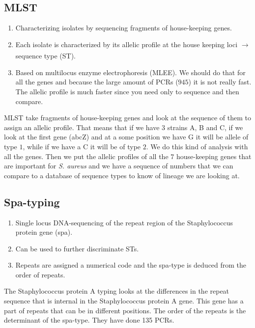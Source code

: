 \subsection{MLST}

\begin{enumerate}
    \item Characterizing isolates by sequencing fragments of house-keeping genes. 
    \item Each isolate is characterized by its allelic profile at the house keeping loci $\xrightarrow[]{}$ sequence type (ST). 
    \item Based on multilocus enzyme electrophoresis (MLEE). We should do that for all the genes and because the large amount of PCRs ($945$) it is not really fast. The allelic profile is much faster since you need only to sequence and then compare. 
\end{enumerate}

MLST take fragments of house-keeping genes and look at the sequence of them to assign an allelic profile. That means that if we have $3$ strains A, B and C, if we look at the first gene (abcZ) and at a some position we have G it will be allele of type $1$, while if we have a C it will be of type $2$. We do this kind of analysis with all the genes. Then we put the allelic profiles of all the $7$ house-keeping genes that are important for \emph{S. aureus} and we have a sequence of numbers that we can compare to a database of sequence types to know of lineage we are looking at. 

\subsection{Spa-typing}

\begin{enumerate}
    \item Single locus DNA-sequencing of the repeat region of the Staphylococcus protein gene (spa).
    \item Can be used to further discriminate STs. 
    \item Repeats are assigned a numerical code and the spa-type is deduced from the order of repeats. 
\end{enumerate}

The Staphylococcus protein A typing looks at the differences in the repeat sequence that is internal in the Staphylococcus protein A gene. This gene has a part of repeats that can be in different positions. The order of the repeats is the determinant of the spa-type. 
They have done 135 PCRs.

